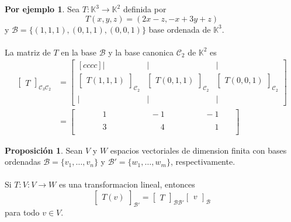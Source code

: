\documentclass{article}
\theoremstyle{definition}
\theoremstyle{definition}
\newtheorem{prop}[teo]{Proposición}
\newtheorem*{ej}{Por ejemplo}
\theoremstyle{remark}
\begin{document}
\begin{ej}
  Sea $T : \mathbb{K}^3 \to \mathbb{K}^2$ definida por \[
T(x,y,z)=(2x-z,-x+3y+z) 
\] y $\mathcal{B}=\{(1,1,1),(0,1,1),(0,0,1)\}$ base ordenada de $\mathbb{K}^3$. \\\\ La matriz de $T$ en la base $\mathcal{B}$ y la base canonica $\mathcal{C}_2$ de $\mathbb{K}^2$ es \[
    \begin{aligned}
      \begin{bmatrix}T \end{bmatrix}_{\mathcal{C}_3 \mathcal{C}_2} &= \begin{bmatrix}[cccc] | & | & | \\ \begin{bmatrix}T(1,1,1)\end{bmatrix}_{\mathcal{C}_{2}} & \begin{bmatrix}T(0,1,1)\end{bmatrix}_{\mathcal{C}_{2}} & \begin{bmatrix}T(0,0,1)\end{bmatrix}_{\mathcal{C}_{2}} \\ | & | & |\end{bmatrix} \\
                                                                   &= \begin{bmatrix} 
                                                                     \quad \; \phantom{-}\;\;1 & \quad \quad \quad \;\; \quad -1 & \quad \quad \quad \;\;\;\; -1 & \phantom{{}_{1_{1}}}\\
                                                                   \quad  \;\phantom{-}\;\;3 & \quad \quad \quad \quad \;\; \phantom{-} 4 & \quad  \; \quad \quad \;\;\; \phantom{-}1 & \phantom{{}_{1_{1}}}\end{bmatrix}
    \end{aligned}
\]
\end{ej}
\begin{prop}
  Sean $V$ y $W$ espacios vectoriales de dimension finita con bases ordenadas $\mathcal{B}=\{v_1, \dots ,v_n\}$ y $\mathcal{B}'=\{w_1, \dots ,w_m\}$, respectivamente. \\\\ Si $T : V : V \to W$ es una transformacion lineal, entonces \[
  \begin{bmatrix}T(v)\end{bmatrix}_{\mathcal{B'}}
  =  
  \begin{bmatrix}
T
\end{bmatrix}_{\mathcal{B}\mathcal{B}'}
\begin{bmatrix}
v
\end{bmatrix}_{\mathcal{B}}
\]
  para todo $v \in V$.
\end{prop}
\end{document}
